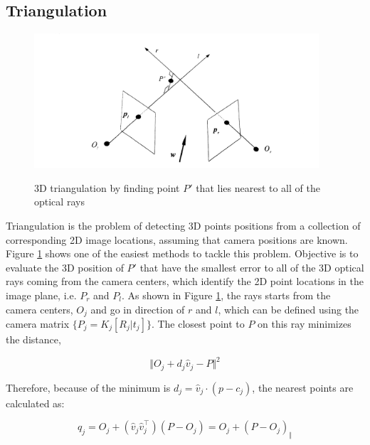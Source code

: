\subsection{Triangulation}
\label{subsec:triangulation}

\begin{figure}[t]
	\begin{center}
		{\includegraphics[width=.8\textwidth, height=5cm, keepaspectratio]{images/triangulation}}
\caption{3D triangulation by finding point $P'$ that lies nearest to all of the optical rays}
\label{fig:triangulation}
	\end{center}
\end{figure}

Triangulation is the problem of detecting 3D points positions from a collection of corresponding 2D image locations, assuming that camera positions are known.
Figure \ref{fig:triangulation} shows one of the easiest methods to tackle this problem. 
Objective is to evaluate the 3D position of $P'$ that have the smallest error to all of the 3D optical rays coming from the camera centers, which identify the 2D point locations in the image plane, i.e. $P_r$ and $P_l$.
As shown in Figure \ref{fig:triangulation}, the rays starts from the camera centers, $O_j$ and go in direction of $r$ and $l$, which can be defined using the camera matrix $ \{ P_j = K_j [ R_j | t_j ] \} $.
The closest point to $P$ on this ray minimizes the distance,

\begin{equation}
\label{eqn:mindist}
	\Vert O_j + d_j \hat{v}_j - P \Vert^2
\end{equation}

Therefore, because of the minimum is $d_j = \hat{v}_j \cdot (p - c_j)$, the nearest points are calculated as:

\begin{equation}\label{eqn:closestpoint}
	q_j = O_j + (\hat{v}_j \hat{v}_j^\top)(P - O_j) = O_j + (P - O_j)_{\Vert}
\end{equation}

